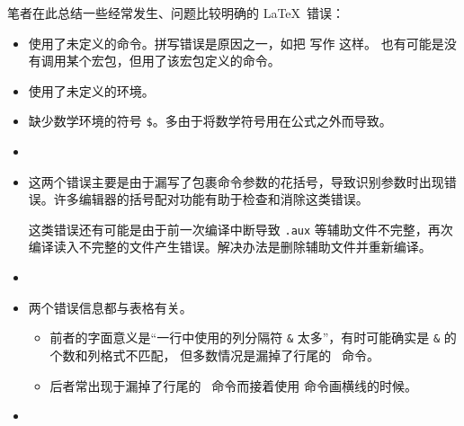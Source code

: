 笔者在此总结一些经常发生、问题比较明确的 \LaTeX\ 错误：

\long{}

\begin{itemize}
\item {}

使用了未定义的命令。拼写错误是原因之一，如把  写作  这样。
也有可能是没有调用某个宏包，但用了该宏包定义的命令。

\item {}

使用了未定义的环境。

\item {}

缺少数学环境的符号 \texttt\$。多由于将数学符号用在公式之外而导致。

\item {}

\item {}

这两个错误主要是由于漏写了包裹命令参数的花括号，导致识别参数时出现错误。许多编辑器的括号配对功能有助于检查和消除这类错误。

这类错误还有可能是由于前一次编译中断导致 \texttt{.aux} 等辅助文件不完整，再次编译读入不完整的文件产生错误。解决办法是删除辅助文件并重新编译。

\item {}

\item {}

两个错误信息都与表格有关。
\begin{itemize}
  \item 前者的字面意义是“一行中使用的列分隔符 \texttt\& 太多”，有时可能确实是 \texttt\& 的个数和列格式不匹配，
  但多数情况是漏掉了行尾的 \crcmd\ 命令。
  \item 后者常出现于漏掉了行尾的 \crcmd\ 命令而接着使用  命令画横线的时候。
\end{itemize}

\item {}


\end{itemize}
